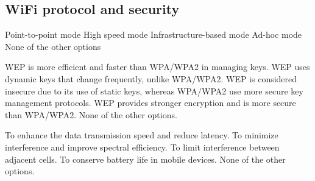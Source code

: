 \subsection{WiFi protocol and security}

\begin{checkboxes}
    \choice Point-to-point mode
    \choice High speed mode
    \CorrectChoice Infrastructure-based mode
    \CorrectChoice Ad-hoc mode
    \choice None of the other options

\end{checkboxes}



\begin{checkboxes}
    \choice WEP is more efficient and faster than WPA/WPA2 in managing keys.
    \choice WEP uses dynamic keys that change frequently, unlike WPA/WPA2.
    \CorrectChoice WEP is considered insecure due to its use of static keys, whereas WPA/WPA2 use more secure key management protocols.
    \choice WEP provides stronger encryption and is more secure than WPA/WPA2.
    \choice None of the other options.
\end{checkboxes}



\begin{checkboxes}
    \choice To enhance the data transmission speed and reduce latency.
    \CorrectChoice To minimize interference and improve spectral efficiency.
    \choice To limit interference between adjacent cells.
    \choice To conserve battery life in mobile devices.
    \choice None of the other options.
\end{checkboxes}



